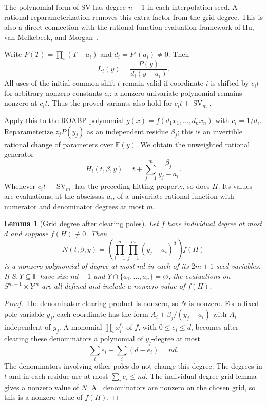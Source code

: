 \documentclass[11pt]{article}
\newtheorem{lemma}[theorem]{Lemma}
\theoremstyle{definition}\newtheorem{definition}[theorem]{Definition}
\theoremstyle{remark}\newtheorem{remark}[theorem]{Remark}
\newcommand{\F}{\mathbb F}
\newcommand{\SV}{\operatorname{SV}}
\begin{document}
The polynomial form of SV has degree $n-1$ in each interpolation seed.
A rational reparameterization removes this extra factor from the grid
degree. This is also a direct connection with the rational-function
evaluation framework of Hu, van Melkebeek, and Morgan~\cite{HMM24}.

Write $P(T)=\prod_i(T-a_i)$ and $d_i=P'(a_i)\ne0$. Then
\[
 L_i(y)=\frac{P(y)}{d_i(y-a_i)}.
\]
All uses of the initial common shift $t$ remain valid if coordinate $i$
is shifted by $c_it$ for arbitrary nonzero constants $c_i$: a nonzero
univariate polynomial remains nonzero at $c_it$. Thus the proved variants
also hold for $c_it+\SV_m$.

Apply this to the ROABP polynomial $g(x)=f(d_1x_1,\ldots,d_nx_n)$ with
$c_i=1/d_i$. Reparameterize $z_jP(y_j)$ as an independent residue
$\beta_j$; this is an invertible rational change of parameters over
$\F(y)$. We obtain the unweighted rational generator
\begin{equation}\label{eq:rational-generator}
 H_i(t,\beta,y)=t+\sum_{j=1}^{m}\frac{\beta_j}{y_j-a_i}.
\end{equation}
Whenever $c_it+\SV_m$ has the preceding hitting property, so does $H$.
Its values are evaluations, at the abscissas $a_i$, of a univariate
rational function with numerator and denominator degrees at most $m$.

\begin{lemma}[Grid degree after clearing poles]\label{lem:rational-grid}
Let $f$ have individual degree at most $d$ and suppose $f(H)\not\equiv0$.
Then
\[
 N(t,\beta,y)=
   \left(\prod_{i=1}^n\prod_{j=1}^{m}(y_j-a_i)^d\right)f(H)
\]
is a nonzero polynomial of degree at most $nd$ in \emph{each} of its
$2m+1$ seed variables. If $S,Y\subseteq\F$ have size $nd+1$ and
$Y\cap\{a_1,\ldots,a_n\}=\varnothing$, the evaluations on
$S^{m+1}\times Y^m$ are all defined and include a nonzero value of $f(H)$.
\end{lemma}
\begin{proof}
The denominator-clearing product is nonzero, so $N$ is nonzero. For a
fixed pole variable $y_j$, each coordinate has the form
$A_i+\beta_j/(y_j-a_i)$ with $A_i$ independent of $y_j$. A monomial
$\prod_i x_i^{e_i}$ of $f$, with $0\le e_i\le d$, becomes after clearing
these denominators a polynomial of $y_j$-degree at most
\[
 \sum_i e_i+\sum_i(d-e_i)=nd.
\]
The denominators involving other poles do not change this degree. The
degrees in $t$ and in each residue are at most $\sum_i e_i\le nd$.
The individual-degree grid lemma gives a nonzero value of $N$. All
denominators are nonzero on the chosen grid, so this is a nonzero value
of $f(H)$.
\end{proof}
\end{document}
